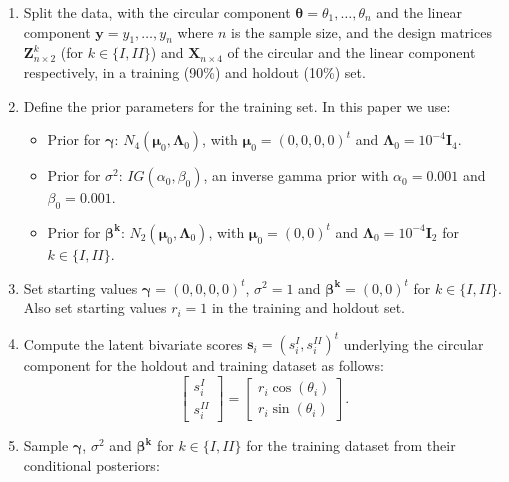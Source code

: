 \documentclass[12pt,]{article}
\begin{document}
\begin{enumerate}
\item Split the data, with the circular component $\boldsymbol{\theta} = \theta_1, \dots, \theta_n$ and the linear component $\boldsymbol{y} = y_1, \dots, y_n$ where $n$ is the sample size, and the design matrices $\boldsymbol{Z}^k_{n \times 2}$ (for $k \in \{I,II\}$) and $\boldsymbol{X}_{n \times 4}$ of the circular and the linear component respectively, in a training (90\%) and holdout (10\%) set. 
\item Define the prior parameters for the training set. In this paper we use:

\begin{itemize}
\item Prior for $\boldsymbol{\gamma}$: $N_4(\boldsymbol{\mu}_{0}, \boldsymbol{\Lambda}_{0})$, with  $\boldsymbol{\mu}_{0} = (0,0,0,0)^t$ and  $\boldsymbol{\Lambda}_{0} = 10^{-4}\boldsymbol{I}_4$.
\item Prior for $\sigma^2$: $IG(\alpha_{0}, \beta_{0})$, an inverse gamma prior with $\alpha_{0} = 0.001$ and  $\beta_{0} = 0.001$.
\item Prior for $\boldsymbol{\beta^{k}}$: $N_2(\boldsymbol{\mu}_{0}, \boldsymbol{\Lambda}_{0})$, with $\boldsymbol{\mu}_{0} = (0,0)^t$ and  $\boldsymbol{\Lambda}_{0} = 10^{-4}\boldsymbol{I}_2$ for $k \in \{I,II\}$.
\end{itemize}

\item Set starting values $\boldsymbol{\gamma} = (0,0,0,0)^t$, $\sigma^2 = 1$ and $\boldsymbol{\beta^{k}} = (0,0)^t$ for $k \in \{I,II\}$. Also set starting values $r_i = 1$ in the training and holdout set. 
\item Compute the latent bivariate scores $\boldsymbol{s}_i = (s_i^{I}, s_i^{II})^t$ underlying the circular component for the holdout and training dataset as follows:
$$\begin{bmatrix} s^{I}_{i} \\ s^{II}_{i} \end{bmatrix} = \begin{bmatrix} r_i \cos (\theta_i)\\  r_i\sin (\theta_i)\end{bmatrix}.$$
\item Sample $\boldsymbol{\gamma}$, $\sigma^2$ and $\boldsymbol{\beta^{k}}$ for $k \in \{I,II\}$ for the training dataset from their conditional posteriors:


\end{enumerate}
\end{document}
